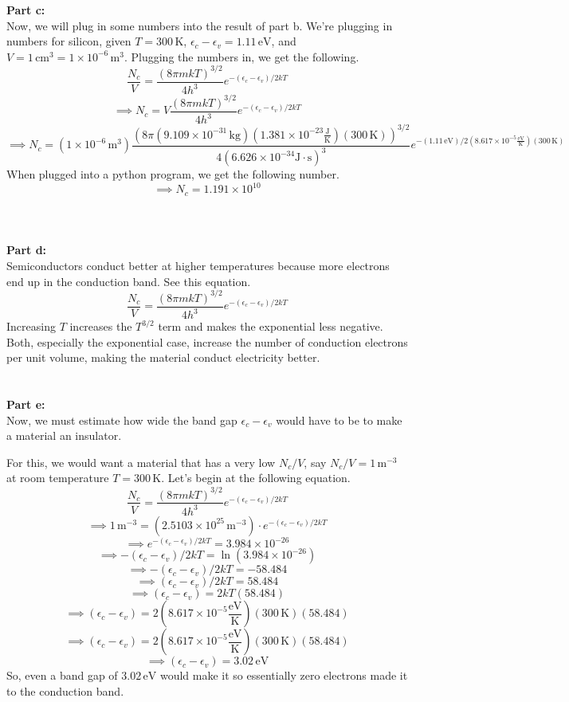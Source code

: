 \documentclass[12pt]{article}
\newcommand{\boltzmannConstK}{1.381\times10^{-23}\frac{\text{J}}{\text{K}}}
\newcommand{\boltzmannConstInEV}{8.617\times10^{-5}\frac{\text{eV}}{\text{K}}}
\newcommand{\planckConst}{6.626\times10^{-34}\text{J}\cdot\text{s}}
\begin{document}
\begin{flushleft}
\textbf{Part c:}\\
Now, we will plug in some numbers into the result of part b.
We're plugging in numbers for silicon, given $T=300\,\text{K}$, $\epsilon_c-\epsilon_v=1.11\,\text{eV}$, and $V=1\,\text{cm}^3=1\times10^{-6}\,\text{m}^3$.
Plugging the numbers in, we get the following.
$$\frac{N_c}{V}=\frac{(8\pi mkT)^{3/2}}{4h^3}e^{-(\epsilon_c-\epsilon_v)/2kT}$$
$$\implies N_c=V\frac{(8\pi mkT)^{3/2}}{4h^3}e^{-(\epsilon_c-\epsilon_v)/2kT}$$
$$\implies N_c=(1\times10^{-6}\,\text{m}^3)\frac{(8\pi (9.109\times10^{-31}\,\text{kg})(\boltzmannConstK)(300\,\text{K}))^{3/2}}{4(\planckConst)^3}e^{-(1.11\,\text{eV})/2(\boltzmannConstInEV)(300\,\text{K})}$$
When plugged into a python program, we get the following number.
$$\implies N_c=1.191\times10^{10}$$\\~\\~\\




\textbf{Part d:}\\
Semiconductors conduct better at higher temperatures because more electrons end up in the conduction band.
See this equation.
$$\frac{N_c}{V}=\frac{(8\pi mkT)^{3/2}}{4h^3}e^{-(\epsilon_c-\epsilon_v)/2kT}$$
Increasing $T$ increases the $T^{3/2}$ term and makes the exponential less negative.
Both, especially the exponential case, increase the number of conduction electrons per unit volume, making the material conduct electricity better.\\~\\~\\



\textbf{Part e:}\\
Now, we must estimate how wide the band gap $\epsilon_c-\epsilon_v$ would have to be to make a material an insulator.

For this, we would want a material that has a very low $N_c/V$, say $N_c/V=1\,\text{m}^{-3}$ at room temperature $T=300\,\text{K}$.
Let's begin at the following equation.
$$\frac{N_c}{V}=\frac{(8\pi mkT)^{3/2}}{4h^3}e^{-(\epsilon_c-\epsilon_v)/2kT}$$
$$\implies1\,\text{m}^{-3}=(2.5103\times10^{25}\,\text{m}^{-3})\cdot e^{-(\epsilon_c-\epsilon_v)/2kT}$$
$$\implies e^{-(\epsilon_c-\epsilon_v)/2kT}=3.984\times10^{-26}$$
$$\implies -(\epsilon_c-\epsilon_v)/2kT=\ln(3.984\times10^{-26})$$
$$\implies -(\epsilon_c-\epsilon_v)/2kT=-58.484$$
$$\implies (\epsilon_c-\epsilon_v)/2kT=58.484$$
$$\implies (\epsilon_c-\epsilon_v)=2kT(58.484)$$
$$\implies (\epsilon_c-\epsilon_v)=2(\boltzmannConstInEV)(300\,\text{K})(58.484)$$
$$\implies (\epsilon_c-\epsilon_v)=2(\boltzmannConstInEV)(300\,\text{K})(58.484)$$
$$\implies (\epsilon_c-\epsilon_v)=3.02\,\text{eV}$$
So, even a band gap of $3.02\,\text{eV}$ would make it so essentially zero electrons made it to the conduction band.




\end{flushleft}
\end{document}

